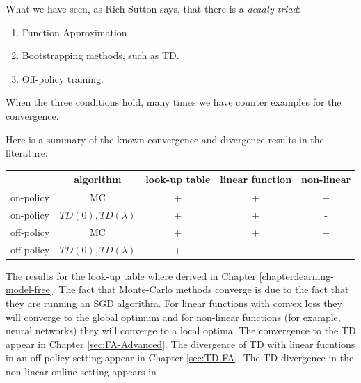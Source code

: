 What we have seen, as Rich Sutton says, that there is a {\em deadly
triad}:
\begin{enumerate}
\item
Function Approximation
\item
Bootstrapping methods, such as TD.
\item
Off-policy training.
\end{enumerate}
When the three conditions hold, many times we have counter examples for the convergence.

Here is a summary of the known convergence and divergence results in
the literature:
\begin{center}
  \begin{tabular}{ | l | c | c|c|c| }
    \hline
    & algorithm & look-up table&linear function&non-linear\\ \hline
    on-policy & MC & + & + & + \\ \hline
    on-policy & $TD(0),TD(\lambda)$ & + & + & -\\ \hline
    off-policy & MC & + & + & + \\ \hline
    off-policy & $TD(0),TD(\lambda)$ & + & - & -\\ \hline
  \end{tabular}
\end{center}

The results for the look-up table where derived in Chapter
\ref{chapter:learning-model-free}.
%
The fact that Monte-Carlo methods converge is due to the fact that
they are running an SGD algorithm. For linear functions with convex
loss they will converge to the global optimum and for non-linear
functions (for example, neural networks) they will converge to a
local optima. The convergence to the TD appear in Chapter
\ref{sec:FA-Advanced}. The divergence of TD with linear fucntions in
an off-policy setting appear in Chapter \ref{sec:TD-FA}. The TD
divergence in the non-linear online setting appears in
\cite{TsitsiklisVR97}.


